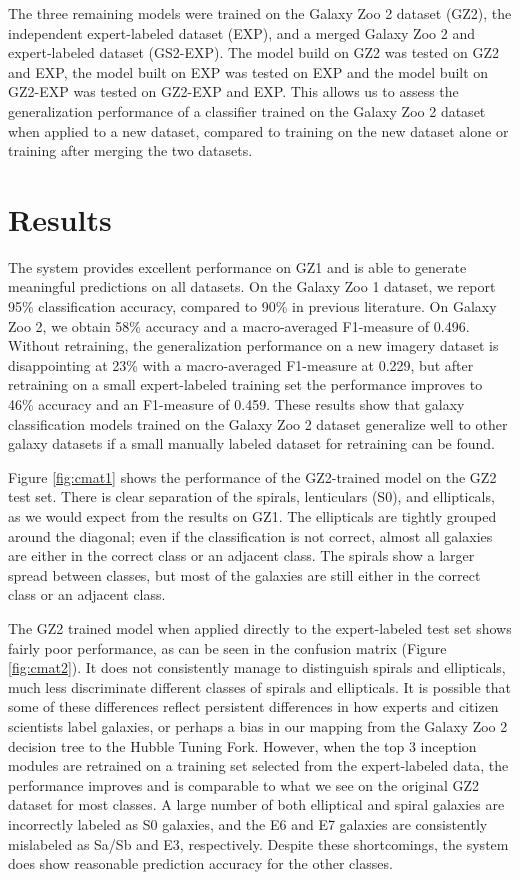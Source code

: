 \documentclass{article}
\begin{document}
The three remaining models were trained on the Galaxy Zoo 2 dataset (GZ2), the independent expert-labeled dataset (EXP), and a merged Galaxy Zoo 2 and expert-labeled dataset (GS2-EXP). The model build on GZ2 was tested on GZ2 and EXP, the model built on EXP was tested on EXP and the model built on GZ2-EXP was tested on GZ2-EXP and EXP. This allows us to assess the generalization performance of a classifier trained on the Galaxy Zoo 2 dataset when applied to a new dataset, compared to training on the new dataset alone or training after merging the two datasets.

\section{Results}
The system provides excellent performance on GZ1 and is able to generate meaningful predictions on all datasets. On the Galaxy Zoo 1 dataset, we report 95\% classification accuracy, compared to 90\% in previous literature. On Galaxy Zoo 2, we obtain 58\% accuracy and a macro-averaged F1-measure of 0.496. Without retraining, the generalization performance on a new imagery dataset is disappointing at 23\% with a macro-averaged F1-measure at 0.229, but after retraining on a small expert-labeled training set the performance improves to 46\% accuracy and an F1-measure of 0.459. These results show that galaxy classification models trained on the Galaxy Zoo 2 dataset generalize well to other galaxy datasets if a small manually labeled dataset for retraining can be found. 

Figure \ref{fig:cmat1} shows the performance of the GZ2-trained model on the GZ2 test set. There is clear separation of the spirals, lenticulars (S0), and ellipticals, as we would expect from the results on GZ1. The ellipticals are tightly grouped around the diagonal; even if the classification is not correct, almost all galaxies are either in the correct class or an adjacent class. The spirals show a larger spread between classes, but most of the galaxies are still either in the correct class or an adjacent class. 

The GZ2 trained model when applied directly to the expert-labeled test set shows fairly poor performance, as can be seen in the confusion matrix (Figure \ref{fig:cmat2}). It does not consistently manage to distinguish spirals and ellipticals, much less discriminate different classes of spirals and ellipticals. It is possible that some of these differences reflect persistent differences in how experts and citizen scientists label galaxies, or perhaps a bias in our mapping from the Galaxy Zoo 2 decision tree to the Hubble Tuning Fork. However, when the top 3 inception modules are retrained on a training set selected from the expert-labeled data, the performance improves and is comparable to what we see on the original GZ2 dataset for most classes. A large number of both elliptical and spiral galaxies are incorrectly labeled as S0 galaxies, and the E6 and E7 galaxies are consistently mislabeled as Sa/Sb and E3, respectively. Despite these shortcomings, the system does show reasonable prediction accuracy for the other classes.  
\end{document}
